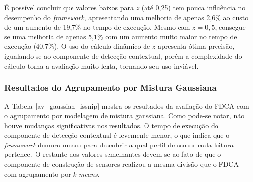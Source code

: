 \documentclass[cic,tc]{iiufrgs}
\begin{document}
\bigskip
\begin{table}[h]
\begin{adjustwidth}{-.5in}{-.5in}
    \caption{Avaliação do fator aleatório do FDCA para o conjunto de dados \textit{ISSNIP}}
    \bigskip
    \begin{center}
    \label{av_r_issnip}
    \end{center}
\end{adjustwidth}
\end{table}

É possível concluir que valores baixos para $z$ (até 0,25) tem pouca influência no desempenho do \textit{framework}, apresentando uma melhoria de apenas 2,6\% ao custo de um aumento de 19,7\% no tempo de execução. Mesmo com $z = 0,5$, consegue-se uma melhoria de apenas 5,1\% com um aumento muito maior no tempo de execução (40,7\%). O uso do cálculo dinâmico de $z$ apresenta ótima precisão, igualando-se ao componente de detecção contextual, porém a complexidade do cálculo torna a avaliação muito lenta, tornando seu uso inviável.

\subsubsection{Resultados do Agrupamento por Mistura Gaussiana}
\label{mistura_issnip}
A Tabela~\ref{av_gaussian_issnip} mostra os resultados da avaliação do FDCA com o agrupamento por modelagem de mistura gaussiana. Como pode-se notar, não houve mudanças significativas nos resultados. O tempo de execução do componente de detecção contextual é levemente menor, o que indica que o \textit{framework} demora menos para descobrir a qual perfil de sensor cada leitura pertence.~O restante dos valores semelhantes devem-se ao fato de que o componente de construção de sensores realizou a mesma divisão que o FDCA com agrupamento por \textit{k-means}. 
\end{document}
